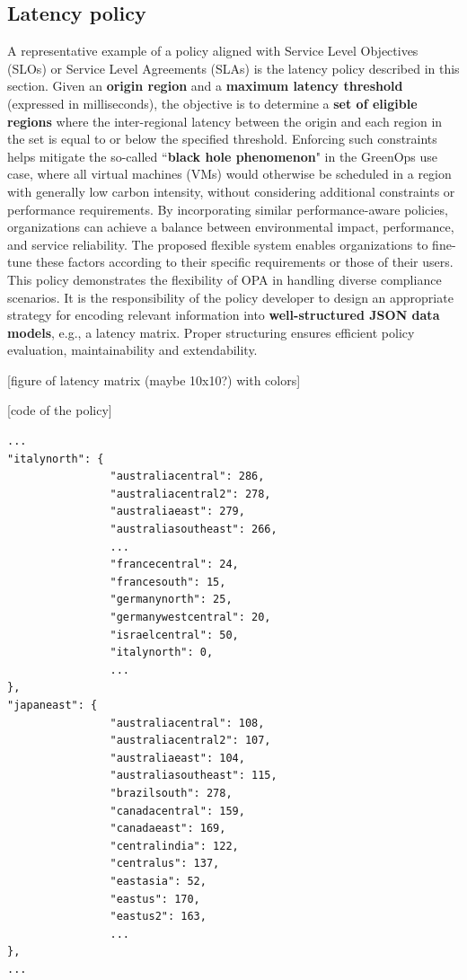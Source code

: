 \subsection{Latency policy}

A representative example of a policy aligned with Service Level Objectives (SLOs) or Service Level Agreements (SLAs) is the latency policy described in this section.
Given an \textbf{origin region} and a \textbf{maximum latency threshold} (expressed in milliseconds), the objective is to determine a \textbf{set of eligible regions} where the inter-regional latency between the origin and each region in the set is equal to or below the specified threshold.
Enforcing such constraints helps mitigate the so-called ``\textbf{black hole phenomenon}" in the GreenOps use case, where all virtual machines (VMs) would otherwise be scheduled in a region with generally low carbon intensity, without considering additional constraints or performance requirements. By incorporating similar performance-aware policies, organizations can achieve a balance between environmental impact, performance, and service reliability.
The proposed flexible system enables organizations to fine-tune these factors according to their specific requirements or those of their users. 
This policy demonstrates the flexibility of OPA in handling diverse compliance scenarios. It is the responsibility of the policy developer to design an appropriate strategy for encoding relevant information into \textbf{well-structured JSON data models}, e.g., a latency matrix. Proper structuring ensures efficient policy evaluation, maintainability and extendability.






[figure of latency matrix (maybe 10x10?) with colors]



[code of the policy]



\lstset{style=jsonstyle}
\begin{lstlisting}[caption={Latancy matrix example}, label={lst:latency_matrix_example}]
...
"italynorth": {
                "australiacentral": 286,
                "australiacentral2": 278,
                "australiaeast": 279,
                "australiasoutheast": 266,
                ...
                "francecentral": 24,
                "francesouth": 15,
                "germanynorth": 25,
                "germanywestcentral": 20,
                "israelcentral": 50,
                "italynorth": 0,
                ...
},
"japaneast": {
                "australiacentral": 108,
                "australiacentral2": 107,
                "australiaeast": 104,
                "australiasoutheast": 115,
                "brazilsouth": 278,
                "canadacentral": 159,
                "canadaeast": 169,
                "centralindia": 122,
                "centralus": 137,
                "eastasia": 52,
                "eastus": 170,
                "eastus2": 163,
                ...
},
...
\end{lstlisting}


